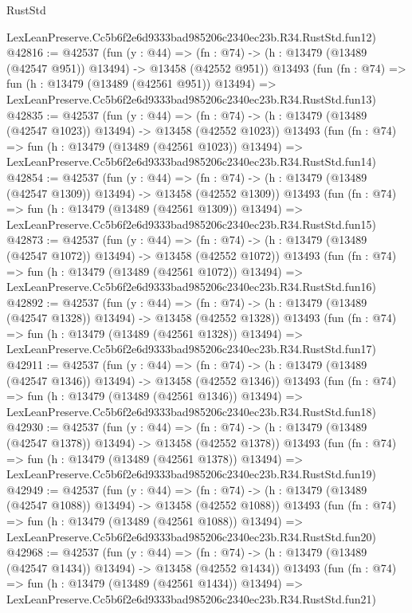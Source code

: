 \begin{lexlean}{RustStd}
\begin{coremodule}
    LexLeanPreserve.Cc5b6f2e6d9333bad985206c2340ec23b.R34.RustStd.fun12)
@42816 := @42537
    (fun (y : @44) =>
    (fn : @74) -> (h : @13479 (@13489 (@42547 @951)) @13494) -> @13458 (@42552 @951))
    @13493
    (fun (fn : @74) =>
    fun (h : @13479 (@13489 (@42561 @951)) @13494) =>
    LexLeanPreserve.Cc5b6f2e6d9333bad985206c2340ec23b.R34.RustStd.fun13)
@42835 := @42537
    (fun (y : @44) =>
    (fn : @74) -> (h : @13479 (@13489 (@42547 @1023)) @13494) -> @13458 (@42552 @1023))
    @13493
    (fun (fn : @74) =>
    fun (h : @13479 (@13489 (@42561 @1023)) @13494) =>
    LexLeanPreserve.Cc5b6f2e6d9333bad985206c2340ec23b.R34.RustStd.fun14)
@42854 := @42537
    (fun (y : @44) =>
    (fn : @74) -> (h : @13479 (@13489 (@42547 @1309)) @13494) -> @13458 (@42552 @1309))
    @13493
    (fun (fn : @74) =>
    fun (h : @13479 (@13489 (@42561 @1309)) @13494) =>
    LexLeanPreserve.Cc5b6f2e6d9333bad985206c2340ec23b.R34.RustStd.fun15)
@42873 := @42537
    (fun (y : @44) =>
    (fn : @74) -> (h : @13479 (@13489 (@42547 @1072)) @13494) -> @13458 (@42552 @1072))
    @13493
    (fun (fn : @74) =>
    fun (h : @13479 (@13489 (@42561 @1072)) @13494) =>
    LexLeanPreserve.Cc5b6f2e6d9333bad985206c2340ec23b.R34.RustStd.fun16)
@42892 := @42537
    (fun (y : @44) =>
    (fn : @74) -> (h : @13479 (@13489 (@42547 @1328)) @13494) -> @13458 (@42552 @1328))
    @13493
    (fun (fn : @74) =>
    fun (h : @13479 (@13489 (@42561 @1328)) @13494) =>
    LexLeanPreserve.Cc5b6f2e6d9333bad985206c2340ec23b.R34.RustStd.fun17)
@42911 := @42537
    (fun (y : @44) =>
    (fn : @74) -> (h : @13479 (@13489 (@42547 @1346)) @13494) -> @13458 (@42552 @1346))
    @13493
    (fun (fn : @74) =>
    fun (h : @13479 (@13489 (@42561 @1346)) @13494) =>
    LexLeanPreserve.Cc5b6f2e6d9333bad985206c2340ec23b.R34.RustStd.fun18)
@42930 := @42537
    (fun (y : @44) =>
    (fn : @74) -> (h : @13479 (@13489 (@42547 @1378)) @13494) -> @13458 (@42552 @1378))
    @13493
    (fun (fn : @74) =>
    fun (h : @13479 (@13489 (@42561 @1378)) @13494) =>
    LexLeanPreserve.Cc5b6f2e6d9333bad985206c2340ec23b.R34.RustStd.fun19)
@42949 := @42537
    (fun (y : @44) =>
    (fn : @74) -> (h : @13479 (@13489 (@42547 @1088)) @13494) -> @13458 (@42552 @1088))
    @13493
    (fun (fn : @74) =>
    fun (h : @13479 (@13489 (@42561 @1088)) @13494) =>
    LexLeanPreserve.Cc5b6f2e6d9333bad985206c2340ec23b.R34.RustStd.fun20)
@42968 := @42537
    (fun (y : @44) =>
    (fn : @74) -> (h : @13479 (@13489 (@42547 @1434)) @13494) -> @13458 (@42552 @1434))
    @13493
    (fun (fn : @74) =>
    fun (h : @13479 (@13489 (@42561 @1434)) @13494) =>
    LexLeanPreserve.Cc5b6f2e6d9333bad985206c2340ec23b.R34.RustStd.fun21)

\end{coremodule}
\end{lexlean}
